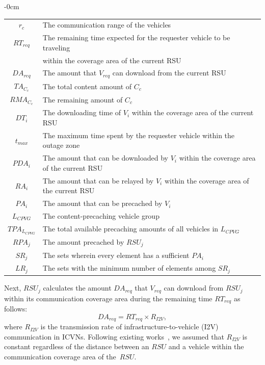 \documentclass[sensors,aricle,accept,pdftex,moreauthors]{Definitions/mdpi}
\begin{document}
\begin{table}[H]
\begin{adjustwidth}{-\extralength}{0cm}
\begin{tabular}{cl}
        $r_{c}$ & The communication range of the vehicles \\
        $RT_{req}$ & The remaining time expected for the requester vehicle to be traveling \\ 
                   & within the coverage area of the current RSU \\
        $DA_{req}$ & The amount that $V_{req}$ can download from the current RSU \\
        $TA_{C_{c}}$ & The total content amount of $C_{c}$ \\
        $RMA_{C_{c}}$ & The remaining amount of $C_{c}$ \\
        $DT_{i}$ & The downloading time of $V_{i}$ within the coverage area of the current RSU \\
        $t_{max}$ & The maximum time spent by the requester vehicle within the outage zone \\
        $PDA_{i}$ & The amount that can be downloaded by $V_{i}$ within the coverage area of the current RSU \\
        $RA_{i}$ & The amount that can be relayed by $V_{i}$ within the coverage area of the current RSU \\ 
        $PA_{i}$ & The amount that can be precached by $V_{i}$ \\
        $L_{CPVG}$ & The content-precaching vehicle group \\
        $TPA_{L_{CPVG}}$ & The total available precaching amounts of all vehicles in $L_{CPVG}$ \\
        $RPA_{j}$ & The amount precached by $RSU_{j}$ \\
        $SR_{j}$ & The sets wherein every element has a sufficient $PA_{i}$ \\
        $LR_{j}$ & The sets with the minimum number of elements among $SR_{j}$ \\
    \bottomrule
    \end{tabular}
\end{adjustwidth}
    \label{tab1}
\end{table}

Next, $RSU_{j}$ calculates the amount $DA_{req}$ that $V_{req}$ can download from $RSU_{j}$ within its communication coverage area during the remaining time $RT_{req}$ as follows:
\begin{equation}
DA_{req}=RT_{req}\times R_{I2V},
\end{equation}
where $R_{I2V}$ is the transmission rate of infrastructure-to-vehicle (I2V) communication in ICVNs. 
Following existing works~\cite{Ahmed2018}, we assumed that $R_{I2V}$ is constant regardless of the distance between an $RSU$ and a vehicle within the communication coverage area of the~$RSU$. 
\end{document}
